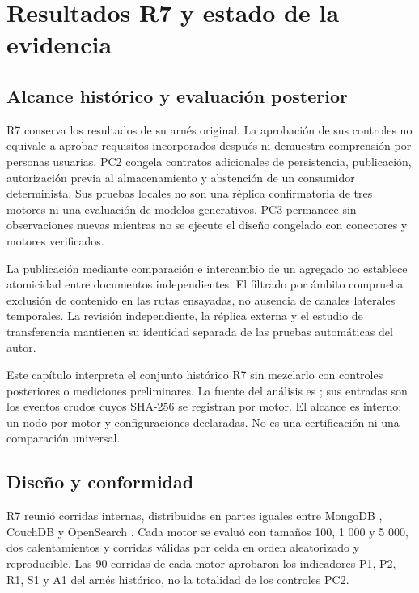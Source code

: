 \chapter{Resultados R7 y estado de la evidencia}

\COBRIAAlcanceEPocho

\section{Alcance histórico y evaluación posterior}





R7 conserva los resultados de su arnés original. La aprobación de sus controles no
equivale a aprobar requisitos incorporados después ni demuestra comprensión por
personas usuarias. PC2 congela contratos adicionales de persistencia, publicación,
autorización previa al almacenamiento y abstención de un consumidor determinista.
Sus pruebas locales no son una réplica confirmatoria de tres motores ni una evaluación
de modelos generativos. PC3 permanece sin observaciones nuevas mientras no se ejecute
el diseño congelado con conectores y motores verificados.

La publicación mediante comparación e intercambio de un agregado no establece
atomicidad entre documentos independientes. El filtrado por ámbito comprueba exclusión
de contenido en las rutas ensayadas, no ausencia de canales laterales temporales.
La revisión independiente, la réplica externa y el estudio de transferencia mantienen
su identidad separada de las pruebas automáticas del autor.

Este capítulo interpreta el conjunto histórico R7 sin mezclarlo con controles
posteriores o mediciones preliminares. La fuente del análisis es
; sus entradas son los
eventos crudos cuyos SHA-256 se registran por motor. El alcance es interno: un nodo por
motor y configuraciones declaradas. No es una certificación ni una comparación universal.

\section{Diseño y conformidad}

R7 reunió \COBRIARSevenObservations{} corridas internas, distribuidas en partes iguales
entre MongoDB \COBRIARSevenMongoVersion, CouchDB \COBRIARSevenCouchVersion{} y
OpenSearch \COBRIARSevenOpenSearchVersion. Cada motor se evaluó con tamaños 100, 1 000
y 5 000, dos calentamientos y \COBRIARSevenRunsPerCell{} corridas válidas por celda en
orden aleatorizado y reproducible. Las 90 corridas de cada motor aprobaron los
indicadores P1, P2, R1, S1 y A1 del arnés histórico, no la totalidad de los controles PC2.

